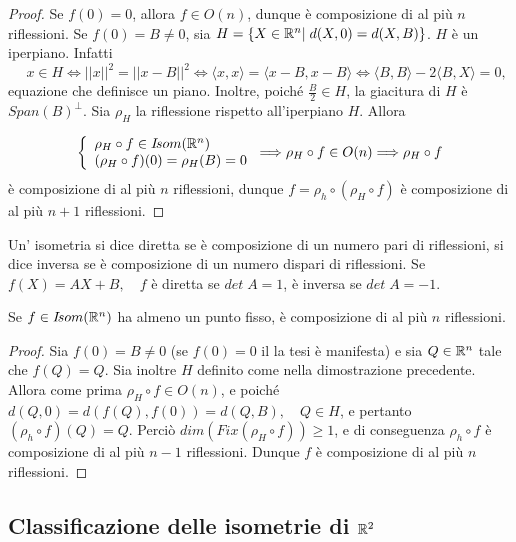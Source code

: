  \begin{proof}
 Se $f(0)=0$, allora $f\in O(n)$, dunque è composizione di al più $n$ 
 riflessioni.
 Se $f(0)=B\ne 0$, sia $H=\{X\in \mathbb R^n|\;d(X,0)=d(X,B)\}$.
 $H$ è un iperpiano. Infatti 
 \[
  \quad x\in H\Longleftrightarrow ||x||^2=||x-B||^2\Longleftrightarrow\langle x,x\rangle=
 \langle x-B,x-B\rangle\Longleftrightarrow\langle B,B\rangle-2\langle B,X\rangle=0,
 \]
 equazione che definisce un piano. Inoltre, poiché $\frac{B}{2}\in H$, la giacitura di $H$ è 
 $Span(B)^{\bot}$.
 Sia $\rho_H$ la riflessione rispetto all'iperpiano $H$.
 Allora
 
 \[ \left\{
 \begin{array}{l}
  \rho_H\circ f\in I\!som( \mathbb R^n) \\
  (\rho_H\circ f)(0)=\rho_H(B)=0
 \end{array}
 \right.
 \Longrightarrow \rho_H\circ f\in O(n)\Longrightarrow \rho_H\circ f
 \]
 è composizione di al più $n$ riflessioni, dunque $f=\rho_h\circ(\rho_H\circ f)$
 è composizione di al più $n+1$ riflessioni.
  \end{proof}
 
 \begin{definition}Un' isometria si dice diretta se è composizione di un numero pari di riflessioni, si dice inversa se
 è composizione di un numero dispari di riflessioni. Se $f(X)=AX+B,\quad f$ è diretta se $det\; A=1$,
 è inversa se $det\; A=-1$.
 \end{definition}
 
 \begin{proposition}
 Se $f\in I\!som( \mathbb R^n)$ ha almeno un punto fisso, è composizione di al più $n$ riflessioni.
 \end{proposition}
 
 \begin{proof}
 Sia $f(0)=B\ne 0$ (se $f(0)=0$ il la tesi è manifesta) e sia $Q\in \mathbb R^n$
 tale che $f(Q)=Q$. Sia inoltre $H$ definito come nella dimostrazione precedente.
 Allora come prima $\rho_H\circ f\in O(n)$, e poiché $d(Q,0)=d(f(Q),f(0))=d(Q,B),\quad Q\in H$, e pertanto
 $(\rho_h\circ f)(Q)=Q$.
 Perciò $dim(Fix(\rho_H\circ f))\ge 1$, e di conseguenza $\rho_h\circ f$ è composizione di al più
 $n-1$
 riflessioni.
 Dunque $f$ è composizione di al più $n$ riflessioni.
  \end{proof}

	\subsection{Classificazione delle isometrie di $\mathbb R^2$}
 

